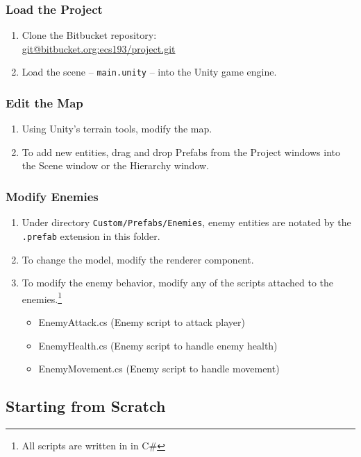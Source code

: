 \documentclass[a4paper]{refart}
\begin{document}
\subsubsection{Load the Project}

\begin{enumerate}
	\item Clone the Bitbucket repository:\\ \url{git@bitbucket.org:ecs193/project.git}
	\item Load the scene -- \texttt{main.unity} -- into the Unity game engine.
\end{enumerate}

\subsubsection{Edit the Map}

\begin{enumerate}
	\item Using Unity's terrain tools, modify the map.
	\item To add new entities, drag and drop Prefabs from the Project windows into the Scene window or the Hierarchy window.
\end{enumerate}

\subsubsection{Modify Enemies}

\begin{enumerate}
	\item Under directory \texttt{Custom/Prefabs/Enemies}, enemy entities are notated by the \texttt{.prefab} extension in this folder.
	\item To change the model, modify the renderer component.
	\item To modify the enemy behavior, modify any of the scripts attached to the enemies.\footnote{All scripts are written in in C\#}
	\begin{itemize}
		\item EnemyAttack.cs (Enemy script to attack player)
		\item EnemyHealth.cs (Enemy script to handle enemy health)
		\item EnemyMovement.cs (Enemy script to handle movement)
	\end{itemize}
\end{enumerate}

\subsection{Starting from Scratch}
\end{document}
